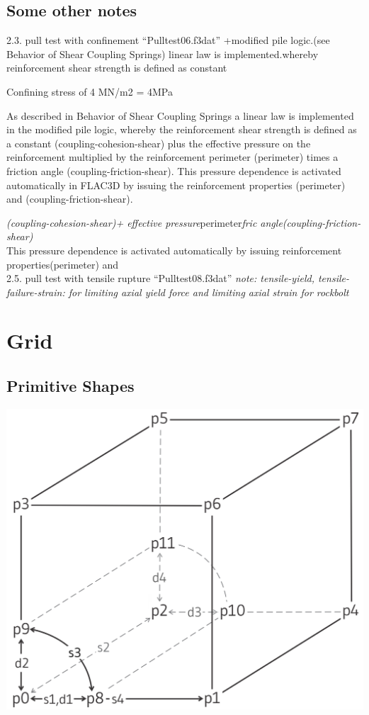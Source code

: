 \documentclass[a4paper, nobind]{templates/ociamthesis}
\begin{document}
\hypertarget{some-other-notes}{%
\section{Some other notes}\label{some-other-notes}}

2.3. pull test with confinement ``Pulltest06.f3dat'' +modified pile
logic.(see Behavior of Shear Coupling Springs) linear law is
implemented.whereby reinforcement shear strength is defined as constant

Confining stress of 4 MN/m2 = 4MPa

As described in Behavior of Shear Coupling Springs a linear law is
implemented in the modified
pile logic, whereby the reinforcement shear strength is defined as a
constant
(coupling-cohesion-shear) plus the effective pressure
on the reinforcement multiplied by the reinforcement perimeter
(perimeter) times a friction angle (coupling-friction-shear). This
pressure dependence is
activated automatically in FLAC3D by issuing the
reinforcement properties (perimeter) and (coupling-friction-shear).

\hfill\break
\emph{(coupling-cohesion-shear)+ effective pressure}perimeter\emph{fric
angle(coupling-friction-shear)}\\
This pressure dependence is activated automatically by issuing
reinforcement properties(perimeter) and\\

2.5. pull test with tensile rupture ``Pulltest08.f3dat'' \emph{note:
tensile-yield, tensile-failure-strain: for limiting axial yield force
and limiting axial strain for rockbolt}

\hypertarget{grid}{%
\chapter{Grid}\label{grid}}

\hypertarget{primitive-shapes}{%
\section{Primitive Shapes}\label{primitive-shapes}}

\includegraphics[width=1\linewidth]{myfigureeeeee/radial-cylinder}
\end{document}

